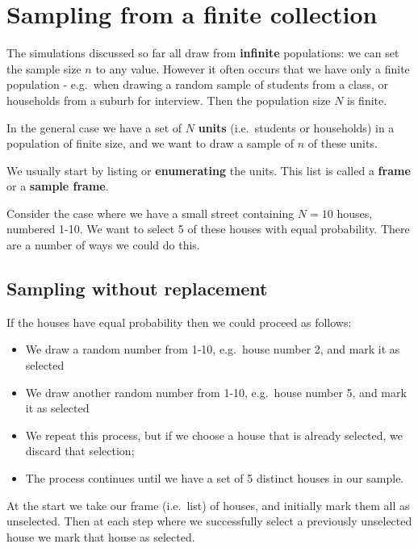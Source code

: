 \documentclass[
]{book}
\providecommand{\tightlist}{%
  \setlength{\itemsep}{0pt}\setlength{\parskip}{0pt}}
\begin{document}
\section{Sampling from a finite collection}\label{sampling-from-a-finite-collection}

The simulations discussed so far all draw from \textbf{infinite} populations:
we can set the sample size \(n\) to any value. However it often occurs that
we have only a finite population - e.g.~when drawing a random sample
of students from a class, or households from a suburb for interview.
Then the population size \(N\) is finite.

In the general case we have a set of \(N\) \textbf{units} (i.e.~students or households)
in a population of finite size, and we want to draw a sample of \(n\) of these units.

We usually start by listing or \textbf{enumerating} the units. This list is called
a \textbf{frame} or a \textbf{sample frame}.

Consider the case where we have a small street containing
\(N=10\) houses, numbered 1-10.
We want to select 5 of these houses with equal probability. There are a number of
ways we could do this.

\subsection{Sampling without replacement}\label{sampling-without-replacement}

If the houses have equal probability then we could proceed as follows:

\begin{itemize}
\tightlist
\item
  We draw a random number from 1-10, e.g.~house number 2, and mark it as selected
\item
  We draw another random number from 1-10, e.g.~house number 5, and mark it as selected
\item
  We repeat this process, but if we choose a house that is already selected, we discard that
  selection;
\item
  The process continues until we have a set of 5 distinct houses in our sample.
\end{itemize}

At the start we take our frame (i.e.~list) of houses,
and initially mark them all as unselected. Then at each step where we
successfully select a previously unselected house we mark that house as selected.
\end{document}
